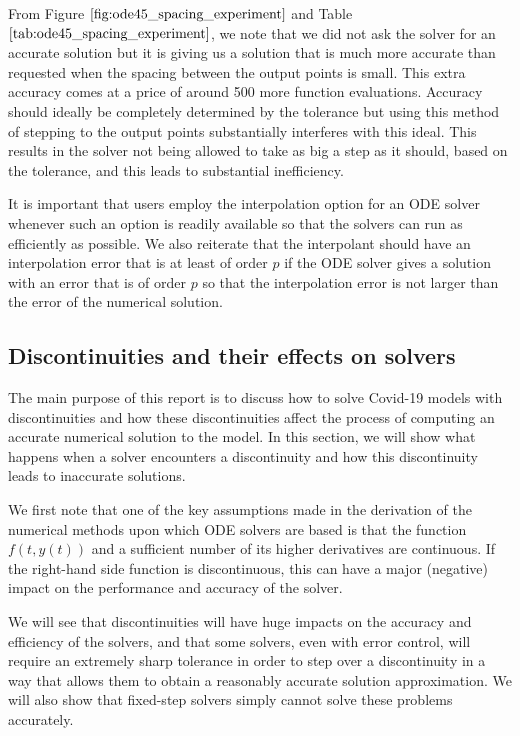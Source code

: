 From Figure $\ref{fig:ode45_spacing_experiment}$ and Table $\ref{tab:ode45_spacing_experiment}$, we note that we did not ask the solver for an accurate solution but it is giving us a solution that is much more accurate than requested when the spacing between the output points is small. This extra accuracy comes at a price of around 500 more function evaluations. Accuracy should ideally be completely determined by the tolerance but using this method of stepping to the output points substantially interferes with this ideal. This results in the solver not being allowed to take as big a step as it should, based on the tolerance, and this leads to substantial inefficiency. 

It is important that users employ the interpolation option for an ODE solver whenever such an option is readily available so that the solvers can run as efficiently as possible. We also reiterate that the interpolant should have an interpolation error that is at least of order $p$ if the ODE solver gives a solution with an error that is of order $p$ so that the interpolation error is not larger than the error of the numerical solution.

\subsection{Discontinuities and their effects on solvers}
\label{subsection:effect_of_discontinuity}
The main purpose of this report is to discuss how to solve Covid-19 models with discontinuities and how these discontinuities affect the process of computing an accurate numerical solution to the model. In this section, we will show what happens when a solver encounters a discontinuity and how this discontinuity leads to inaccurate solutions.

We first note that one of the key assumptions made in the derivation of the numerical methods upon which ODE solvers are based is that the function $f(t, y(t))$ and a sufficient number of its higher derivatives are continuous. If the right-hand side function is discontinuous, this can have a major (negative) impact on the performance and accuracy of the solver. 

We will see that discontinuities will have huge impacts on the accuracy and efficiency of the solvers, and that some solvers, even with error control, will require an extremely sharp tolerance in order to step over a discontinuity in a way that allows them to obtain a reasonably accurate solution approximation. We will also show that fixed-step solvers simply cannot solve these problems accurately. 

